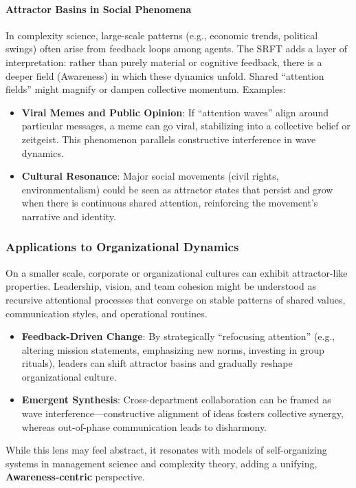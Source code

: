 \documentclass[12pt,a4paper]{article}
\begin{document}
\paragraph{Attractor Basins in Social Phenomena}
In complexity science, large-scale patterns (e.g., economic trends, political swings) often arise from feedback loops among agents. The SRFT adds a layer of interpretation: rather than purely material or cognitive feedback, there is a deeper field (Awareness) in which these dynamics unfold. Shared “attention fields” might magnify or dampen collective momentum. Examples:
\begin{itemize}
    \item \textbf{Viral Memes and Public Opinion}: If “attention waves” align around particular messages, a meme can go viral, stabilizing into a collective belief or zeitgeist. This phenomenon parallels constructive interference in wave dynamics.
    \item \textbf{Cultural Resonance}: Major social movements (civil rights, environmentalism) could be seen as attractor states that persist and grow when there is continuous shared attention, reinforcing the movement’s narrative and identity.
\end{itemize}

\subsubsection{Applications to Organizational Dynamics}
On a smaller scale, corporate or organizational cultures can exhibit attractor-like properties. Leadership, vision, and team cohesion might be understood as recursive attentional processes that converge on stable patterns of shared values, communication styles, and operational routines. 
\begin{itemize}
    \item \textbf{Feedback-Driven Change}: By strategically “refocusing attention” (e.g., altering mission statements, emphasizing new norms, investing in group rituals), leaders can shift attractor basins and gradually reshape organizational culture.
    \item \textbf{Emergent Synthesis}: Cross-department collaboration can be framed as wave interference—constructive alignment of ideas fosters collective synergy, whereas out-of-phase communication leads to disharmony.
\end{itemize}
While this lens may feel abstract, it resonates with models of self-organizing systems in management science and complexity theory, adding a unifying, \textbf{Awareness-centric} perspective.
\end{document}
